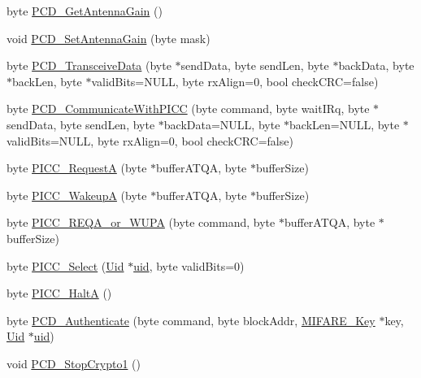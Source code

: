 \begin{DoxyCompactItemize}
\item 
byte \hyperlink{class_m_f_r_c522_aa02ae994a9ebf146475f46fc538cef28}{P\+C\+D\+\_\+\+Get\+Antenna\+Gain} ()
\item 
void \hyperlink{class_m_f_r_c522_a5ce84dd855f2ae297dd00fafaf62ef78}{P\+C\+D\+\_\+\+Set\+Antenna\+Gain} (byte mask)
\item 
byte \hyperlink{class_m_f_r_c522_a4d967509ca687fca2dbfd0d867b38d8d}{P\+C\+D\+\_\+\+Transceive\+Data} (byte $\ast$send\+Data, byte send\+Len, byte $\ast$back\+Data, byte $\ast$back\+Len, byte $\ast$valid\+Bits=N\+U\+LL, byte rx\+Align=0, bool check\+C\+RC=false)
\item 
byte \hyperlink{class_m_f_r_c522_a731cc27ae35b1bba2d2c9d2af28b5c23}{P\+C\+D\+\_\+\+Communicate\+With\+P\+I\+CC} (byte command, byte wait\+I\+Rq, byte $\ast$send\+Data, byte send\+Len, byte $\ast$back\+Data=N\+U\+LL, byte $\ast$back\+Len=N\+U\+LL, byte $\ast$valid\+Bits=N\+U\+LL, byte rx\+Align=0, bool check\+C\+RC=false)
\item 
byte \hyperlink{class_m_f_r_c522_a6db371f6ca95e8ea22445124c79012cc}{P\+I\+C\+C\+\_\+\+RequestA} (byte $\ast$buffer\+A\+T\+QA, byte $\ast$buffer\+Size)
\item 
byte \hyperlink{class_m_f_r_c522_a009dfa9138c6f999af82d7fc5b17a272}{P\+I\+C\+C\+\_\+\+WakeupA} (byte $\ast$buffer\+A\+T\+QA, byte $\ast$buffer\+Size)
\item 
byte \hyperlink{class_m_f_r_c522_a43d475b7d21f31bd1104e81ea5e3d1c9}{P\+I\+C\+C\+\_\+\+R\+E\+Q\+A\+\_\+or\+\_\+\+W\+U\+PA} (byte command, byte $\ast$buffer\+A\+T\+QA, byte $\ast$buffer\+Size)
\item 
byte \hyperlink{class_m_f_r_c522_ab40449ac80501db28d25889612bb2db0}{P\+I\+C\+C\+\_\+\+Select} (\hyperlink{struct_m_f_r_c522_1_1_uid}{Uid} $\ast$\hyperlink{class_m_f_r_c522_ad456545d41962dd7f8bd4210f5618498}{uid}, byte valid\+Bits=0)
\item 
byte \hyperlink{class_m_f_r_c522_aaa152b63193d852bf2edcfae3044bea4}{P\+I\+C\+C\+\_\+\+HaltA} ()
\item 
byte \hyperlink{class_m_f_r_c522_a26469f6295cd9796e0bb781c48036971}{P\+C\+D\+\_\+\+Authenticate} (byte command, byte block\+Addr, \hyperlink{struct_m_f_r_c522_1_1_m_i_f_a_r_e___key}{M\+I\+F\+A\+R\+E\+\_\+\+Key} $\ast$key, \hyperlink{struct_m_f_r_c522_1_1_uid}{Uid} $\ast$\hyperlink{class_m_f_r_c522_ad456545d41962dd7f8bd4210f5618498}{uid})
\item 
void \hyperlink{class_m_f_r_c522_a24d3ab7b2170fdfa3f0121a7256f12d9}{P\+C\+D\+\_\+\+Stop\+Crypto1} ()
\item 

\end{DoxyCompactItemize}
